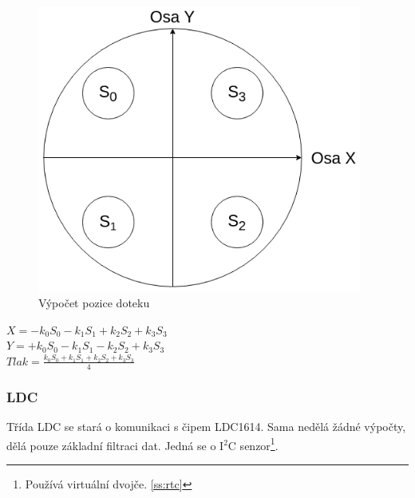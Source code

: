 \begin{figure}[H]
    \begin{small}
        \begin{center}
            \includegraphics[width=0.95\textwidth]{img/Touchpad_calculation.png}
        \end{center}
        \caption{Výpočet pozice doteku}
        \label{fig:touchpad_calculation}
    \end{small}
\end{figure}

\begin{listedequation}[H]
    \begin{center}
        $X = -k_0S_0 -k_1S_1 +k_2S_2 +k_3S_3$\\
        $Y = +k_0S_0 -k_1S_1 -k_2S_2 +k_3S_3$\\
        $Tlak = \frac{k_0S_0 +k_1S_1 +k_2S_2 +k_3S_3}{4}$
    \end{center}
    \caption{Výpočet parametrů doteku}
    \label{eq:touchpad_calculation_X}
\end{listedequation}

\subsubsection{LDC}

Třída LDC se stará o komunikaci s čipem LDC1614.
Sama nedělá žádné výpočty, dělá pouze základní filtraci dat.
Jedná se o I$^2$C senzor\footnote{Používá virtuální dvojče. \autoref{ss:rtc}}.

